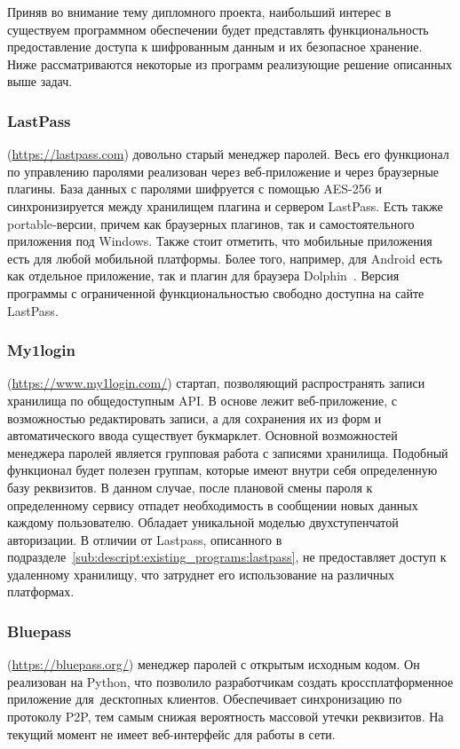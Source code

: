 Приняв во внимание тему дипломного проекта, наибольший интерес в существуем программном обеспечении будет представлять функциональность предоставление доступа к шифрованным данным и их безопасное хранение.
Ниже рассматриваются некоторые из программ реализующие решение описанных выше задач.

\subsubsection{LastPass }(\url{https://lastpass.com})
\label{sub:descript:existing_programs:lastpass}
довольно старый менеджер паролей. Весь его функционал по управлению паролями реализован через веб-приложение и через браузерные плагины.
База данных с паролями шифруется с помощью AES-256 и синхронизируется между хранилищем плагина и сервером LastPass. Есть также portable-версии, причем как браузерных плагинов, так и самостоятельного приложения под Windows.
Также стоит отметить, что мобильные приложения есть для любой мобильной платформы. Более того, например, для Android есть как отдельное приложение, так и плагин для браузера Dolphin~\cite{dolphin}.
Версия программы с ограниченной функциональностью свободно доступна на сайте LastPass.

\subsubsection{My1login }(\url{https://www.my1login.com/})
\label{sub:descript:existing_programs:myonelogin}
стартап, позволяющий распространять записи хранилища по общедоступным API. В основе лежит веб-приложение, с возможностью редактировать записи, а для сохранения их из форм и автоматического ввода существует \javascr{} букмарклет. Основной возможностей менеджера паролей является групповая работа с записями хранилища.
Подобный функционал будет полезен группам, которые имеют внутри себя определенную базу реквизитов. В данном случае, после плановой смены пароля к определенному сервису отпадет необходимость в сообщении новых данных каждому пользователю.
Обладает уникальной моделью двухступенчатой авторизации.
В отличии от Lastpass, описанного в подразделе~\ref{sub:descript:existing_programs:lastpass}, не предоставляет доступ к удаленному хранилищу, что затруднет его использование на различных платформах.

\subsubsection{Bluepass }(\url{https://bluepass.org/})
\label{sub:descript:existing_programs:myonelogin}
менеджер паролей с открытым исходным кодом.
Он реализован на Python, что позволило разработчикам создать кроссплатформенное приложение для десктопных клиентов. Обеспечивает синхронизацию по протоколу P2P, тем самым снижая вероятность массовой утечки реквизитов. На текущий момент не имеет веб-интерфейс для работы в сети.

